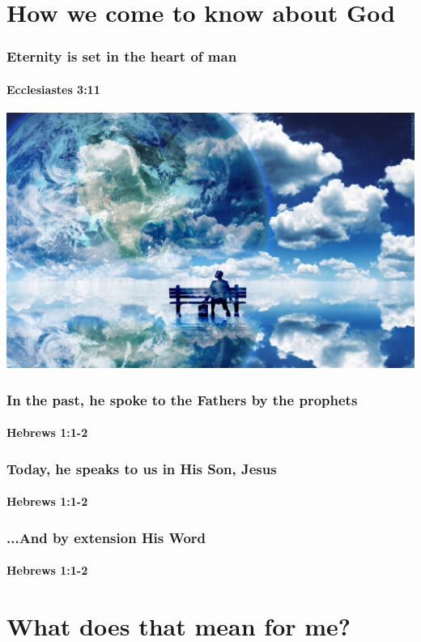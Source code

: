 \section{How we come to know about God}

\begin{frame}
\frametitle{Eternity is set in the heart of man}
\framesubtitle{Ecclesiastes 3:11}
\includegraphics[width=\textwidth]{figures/eternityInHeart.jpg}

\end{frame}

\begin{frame}
	\frametitle{In the past, he spoke to the Fathers by the prophets}
	\framesubtitle{Hebrews 1:1-2}
\end{frame}

\begin{frame}
	\frametitle{Today, he speaks to us in His Son, Jesus}
	\framesubtitle{Hebrews 1:1-2}
\end{frame}

\begin{frame}
	\frametitle{...And by extension His Word}
	\framesubtitle{Hebrews 1:1-2}
	
\end{frame}

\section{What does that mean for me?}

